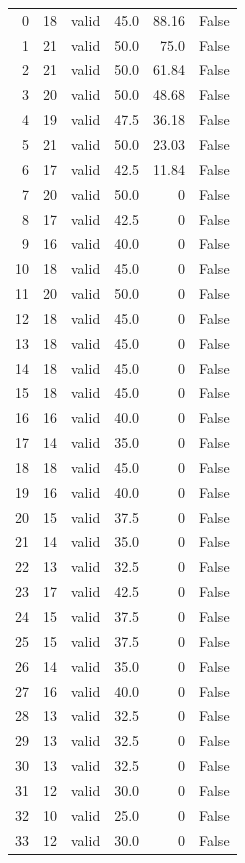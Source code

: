 \begin{small}
\begin{longtable}{@{}rrrrrl@{}}
0 & 18 & valid & 45.0 & 88.16 & False \\
1 & 21 & valid & 50.0 & 75.0 & False \\
2 & 21 & valid & 50.0 & 61.84 & False \\
3 & 20 & valid & 50.0 & 48.68 & False \\
4 & 19 & valid & 47.5 & 36.18 & False \\
5 & 21 & valid & 50.0 & 23.03 & False \\
6 & 17 & valid & 42.5 & 11.84 & False \\
7 & 20 & valid & 50.0 & 0 & False \\
8 & 17 & valid & 42.5 & 0 & False \\
9 & 16 & valid & 40.0 & 0 & False \\
10 & 18 & valid & 45.0 & 0 & False \\
11 & 20 & valid & 50.0 & 0 & False \\
12 & 18 & valid & 45.0 & 0 & False \\
13 & 18 & valid & 45.0 & 0 & False \\
14 & 18 & valid & 45.0 & 0 & False \\
15 & 18 & valid & 45.0 & 0 & False \\
16 & 16 & valid & 40.0 & 0 & False \\
17 & 14 & valid & 35.0 & 0 & False \\
18 & 18 & valid & 45.0 & 0 & False \\
19 & 16 & valid & 40.0 & 0 & False \\
20 & 15 & valid & 37.5 & 0 & False \\
21 & 14 & valid & 35.0 & 0 & False \\
22 & 13 & valid & 32.5 & 0 & False \\
23 & 17 & valid & 42.5 & 0 & False \\
24 & 15 & valid & 37.5 & 0 & False \\
25 & 15 & valid & 37.5 & 0 & False \\
26 & 14 & valid & 35.0 & 0 & False \\
27 & 16 & valid & 40.0 & 0 & False \\
28 & 13 & valid & 32.5 & 0 & False \\
29 & 13 & valid & 32.5 & 0 & False \\
30 & 13 & valid & 32.5 & 0 & False \\
31 & 12 & valid & 30.0 & 0 & False \\
32 & 10 & valid & 25.0 & 0 & False \\
33 & 12 & valid & 30.0 & 0 & False \\

\end{longtable}
\end{small}
